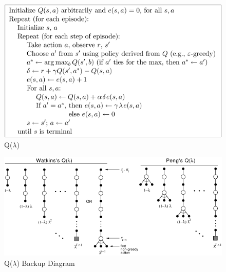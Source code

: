 \documentclass{article}
\begin{document}
\begin{figure}[h]
\includegraphics[scale=0.5]{q_lambda}
\centering
\caption{Q($\lambda$)}
\end{figure}

\begin{figure}[h]
\includegraphics[scale=0.5]{q_lambda_diagram}
\centering
\caption{Q($\lambda$) Backup Diagram}
\end{figure}
\end{document}
